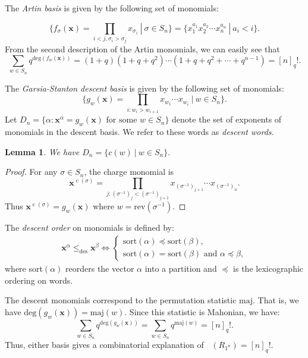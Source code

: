 \documentclass[10pt]{amsart}
\theoremstyle{plain}
\theoremstyle{definition}
\theoremstyle{plain}
\newtheorem{lemma}[lemma]{Lemma}
\theoremstyle{plain}
\theoremstyle{remark}
\theoremstyle{plain}
\theoremstyle{plain}
\DeclareMathOperator{\Hilb}{Hilb}
\DeclareMathOperator{\cw}{c}
\DeclareMathOperator{\Hilbq}{\Hilb_q}
\begin{document}
The \textit{Artin basis} is given by the following set of monomials:

\[\{f_\sigma(\mathbf{x}) = \prod_{i<j, \sigma_i > \sigma_j} x_{\sigma_i} \  | \ \sigma \in S_n \} = \{x_1^{a_1}x_2^{a_2}\cdots x_n^{a_n} \ | \ a_i < i\}.\]
From the second description of the Artin monomials, we can easily see that \[\sum_{w\in S_n}q^{\text{deg}(f_w(\mathbf{x}))} = (1+q)(1+q+q^2) \cdots (1+q+q^2+\cdots + q^{n-1}) = [n]_q!.\]

The \textit{Garsia-Stanton descent basis} is given by the following set of monomials:
\[\{g_w (\mathbf{x}) = \prod_{i:w_i > w_{i+1}} x_{w_1} \cdots x_{w_i} \ | \ w \in S_n\}.\]
Let $D_n = \{\alpha : \mathbf{x}^{\alpha} = g_w(\mathbf{x}) \text{ for some } w \in S_n\}$ denote the set of exponents of monomials in the descent basis. We refer to these words as \textit{descent words.} 
\begin{lemma}\label{lemma:charge and majt}
    We have $D_n = \{c(w) \ | \ w \in S_n\}.$
\end{lemma}
\begin{proof}
    For any $\sigma\in S_n$, the charge monomial is  \[\mathbf{x}^{\cw(\sigma)} = \prod_{j:(\sigma^{-1})_{j} < (\sigma^{-1})_{j+1}} x_{(\sigma^{-1})_{j+1}} \cdots x_{(\sigma^{-1})_n}.\]
Thus $\mathbf{x}^{\cw(\sigma)} = g_w(\mathbf{x})$ where $w = \text{rev}(\sigma^{-1})$. 
\end{proof}

The \textit{descent order} on monomials is defined by:
\begin{align}\label{eq:descent order}
    \mathbf{x}^{\alpha} \leq_{\text{des}}\mathbf{x}^{\beta} \Leftrightarrow \begin{cases}
    \text{sort}(\alpha) \preceq \text{sort}(\beta),  \\ \text{sort}(\alpha) = \text{sort}(\beta) \text{ and } \alpha \preceq \beta,
\end{cases}
\end{align}
where sort$(\alpha)$ reorders the vector $\alpha$ into a partition and $\preceq$ is the lexicographic ordering on words.

The descent monomials correspond to the permutation statistic $\text{maj}$. That is, we have $\text{deg}(g_w(\mathbf{x})) = \text{maj}(w)$. 
Since this statistic is Mahonian, we have:
 \[\sum\limits_{w\in S_n} q^{\text{deg}(g_{w}(\mathbf{x}))} = \sum\limits_{w\in S_n} q^{\text{maj}(w)} = [n]_q!.\]
Thus, either basis gives a combinatorial explanation of $\Hilbq(R_{1^n}) = [n]_q!$. 
\end{document}
